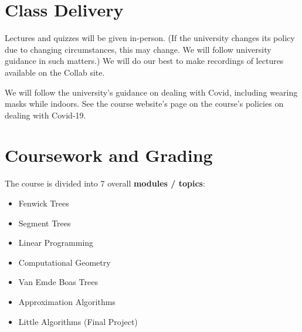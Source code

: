 \documentclass[12pt]{article}
\begin{document}
\section*{Class Delivery}

Lectures and quizzes will be given in-person.  (If the university changes its policy due to changing circumstances, this may change. We will follow university guidance in such matters.) We will do our best to make recordings of lectures available on the Collab site.

We will follow the university's guidance on dealing with Covid, including wearing masks while indoors. See the course website's page on the course's policies on dealing with Covid-19.



\section*{Coursework and Grading}

The course is divided into 7 overall {\bf modules / topics}:
\begin{itemize}
    \item Fenwick Trees
    \item Segment Trees
    \item Linear Programming
    \item Computational Geometry
    \item Van Emde Boas Trees
    \item Approximation Algorithms
    \item Little Algorithms (Final Project)
\end{itemize}
\end{document}
